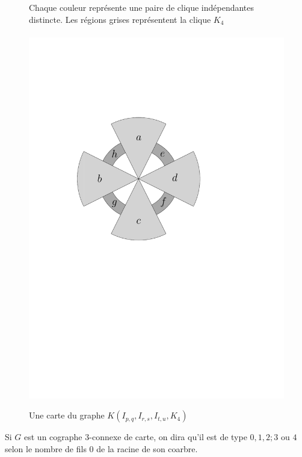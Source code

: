 \documentclass{scrartcl}
\begin{document}
\begin{flushleft}
\begin{figure}[h]
    \caption{Une carte du graphe $K(I_{p,q}, I_{r,s}, I_{t,u}, K_4)$}\label{IpqIrsItuMap}
    \begin{center}
        Chaque couleur représente une paire de clique indépendantes distincte. Les régions grises représentent la clique $K_4$
        \\~\\
        \includegraphics[page=\ipeFigIpqIrsItuMap, scale = 0.6]{figs}
    \end{center}
\end{figure}

\begin{def*}[Type]
    Si $G$ est un cographe $3$-connexe de carte, on dira qu'il est de type $0,1,2;3$ ou $4$ selon le nombre de fils $0$ de
    la racine de son coarbre.
\end{def*}


\end{flushleft}
\end{document}

